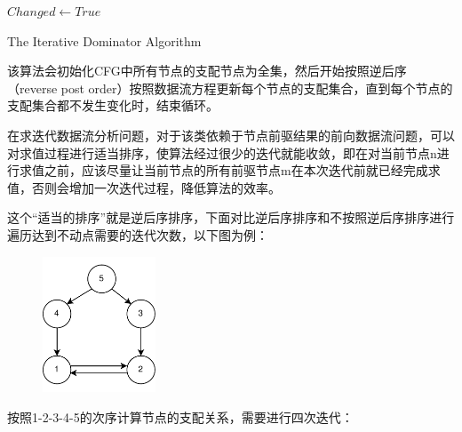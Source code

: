 \begin{algorithm}[htb]
  \small
  \SetAlgoLined
  $Changed \leftarrow True$
  
  \caption{The Iterative Dominator Algorithm}
  \label{algo:dom}
\end{algorithm}

该算法会初始化CFG中所有节点的支配节点为全集，然后开始按照逆后序（reverse post order）按照数据流方程更新每个节点的支配集合，直到每个节点的支配集合都不发生变化时，结束循环。

在求迭代数据流分析问题，对于该类依赖于节点前驱结果的前向数据流问题，可以对求值过程进行适当排序，使算法经过很少的迭代就能收敛，即在对当前节点n进行求值之前，应该尽量让当前节点的所有前驱节点m在本次迭代前就已经完成求值，否则会增加一次迭代过程，降低算法的效率。

这个“适当的排序”就是逆后序排序，下面对比逆后序排序和不按照逆后序排序进行遍历达到不动点需要的迭代次数，以下图为例：
\begin{figure}[htb]
  \centering
  \includegraphics[width=0.3\textwidth]{figures/dom.pdf}
  \label{fig:dom}
\end{figure}

按照1-2-3-4-5的次序计算节点的支配关系，需要进行四次迭代：

